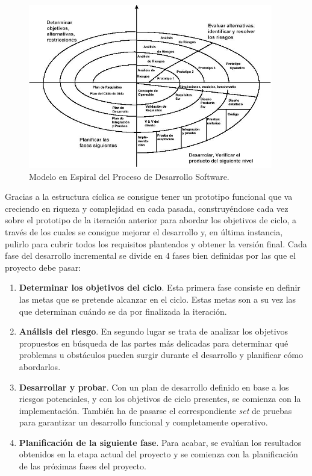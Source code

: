\begin{figure}[!htbp]  \centering\noindent
    \includegraphics[width=0.95\textwidth]{figures/espiral_boehm.jpg}
    \caption{Modelo en Espiral del Proceso de Desarrollo Software.}
    \label{espiral_bb}
\end{figure}

Gracias a la estructura cíclica se consigue tener un prototipo funcional que va creciendo en riqueza y complejidad en cada pasada, construyéndose cada vez sobre el prototipo de la iteración anterior para abordar los objetivos de ciclo, a través de los cuales se consigue mejorar el desarrollo y, en última instancia, pulirlo para cubrir todos los requisitos planteados y obtener la versión final. Cada fase del desarrollo incremental se divide en 4 fases bien definidas por las que el proyecto debe pasar:
\begin{enumerate}
    \item \textbf{Determinar los objetivos del ciclo}. Esta primera fase consiste en definir las metas que se pretende alcanzar en el ciclo. Estas metas son a su vez las que determinan cuándo se da por finalizada la iteración.
    \item \textbf{Análisis del riesgo}. En segundo lugar se trata de analizar los objetivos propuestos en búsqueda de las partes más delicadas para determinar qué problemas u obstáculos pueden surgir durante el desarrollo y planificar cómo abordarlos.
    \item \textbf{Desarrollar y probar}. Con un plan de desarrollo definido en base a los riesgos potenciales, y con los objetivos de ciclo presentes, se comienza con la implementación. También ha de pasarse el correspondiente \textit{set} de pruebas para garantizar un desarrollo funcional y completamente operativo.
    \item \textbf{Planificación de la siguiente fase}. Para acabar, se evalúan los resultados obtenidos en la etapa actual del proyecto y se comienza con la planificación de las próximas fases del proyecto.
\end{enumerate}
